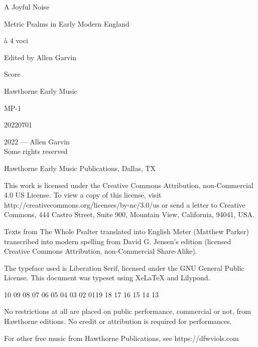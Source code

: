 \documentclass[12pt]{memoir}
\begin{document}
\pagestyle{empty}

\vspace*{\fill}

\begin{center}
\fontsize{44pt}{44pt}\selectfont
    A Joyful Noise\par
    \vspace{1in}\par
    Metric Psalms in Early Modern England\par
\end{center}

\begin{center}
\fontsize{24pt}{24pt}\selectfont
à 4 voci\par
    \vspace{1in}
\end{center}

\begin{center}
\fontsize{14pt}{14pt}\selectfont
Edited by Allen Garvin\par
    \vspace{1in}
\fontsize{14pt}{14pt}\selectfont
Score\par
\end{center}

\vspace*{\fill}

\begin{center}
Hawthorne Early Music\par
MP-1\par
20220701
\end{center}

\begingroup
\footnotesize
\setlength{\parindent}{0pt}
\setlength{\parskip}{\baselineskip}
\textcopyright{}2022 --- Allen Garvin\\
Some rights reserved

Hawthorne Early Music Publications, Dallas, TX

This work is licensed under the Creative Commons Attribution, non-Commercial 4.0 US License. To view a copy of this license, visit http://creativecommons.org/licenses/by-nc/3.0/us or send a letter to Creative Commons, 444 Castro Street, Suite 900, Mountain View, California, 94041, USA.

Texts from The Whole Psalter translated into English Meter (Matthew Parker) transcribed into modern spelling from David G. Jensen's edition (licensed Creative Commons Attribution, non-Commercial Share-Alike).

The typeface used is Liberation Serif, licensed under the GNU General Public License. This document was typeset using XeLaTeX and Lilypond.

\begin{center}
10 09 08 07 06 05 04 03 02 01\hspace{2em}19 18 17 16 15 14 13
\end{center}

No restrictions at all are placed on public performance, commercial or not, 
from Hawthorne editions. No credit or attribution is required for 
performances.

For other free music from Hawthorne Publications, see https://dfwviols.com
\end{document}
